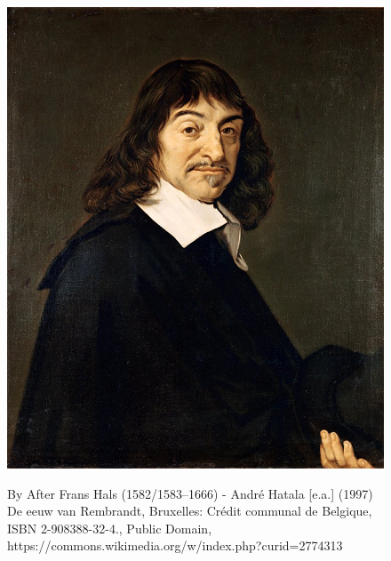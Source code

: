 

\begin{frame}{}
    \begin{figure}
        \includegraphics[scale=0.2]{images/descartes}

        \footnotesize{By After Frans Hals (1582/1583–1666) - André Hatala [e.a.] (1997) De eeuw van Rembrandt, Bruxelles: Crédit communal de Belgique, ISBN 2-908388-32-4., Public Domain, https://commons.wikimedia.org/w/index.php?curid=2774313}
    \end{figure}
\end{frame}

